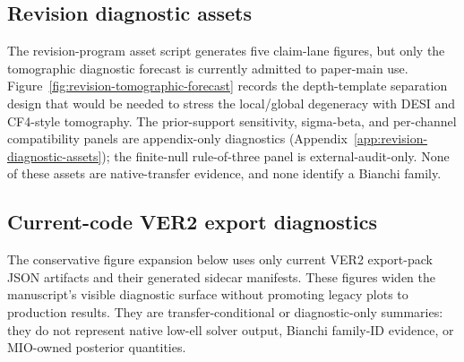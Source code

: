 \subsection{Revision diagnostic assets}
\label{sec:revision-diagnostic-assets}

The revision-program asset script generates five claim-lane figures,
but only the tomographic diagnostic forecast is currently admitted to
paper-main use.  Figure~\ref{fig:revision-tomographic-forecast}
records the depth-template separation design that would be needed to
stress the local/global degeneracy with DESI and CF4-style tomography.
The prior-support sensitivity, sigma-beta, and per-channel compatibility
panels are appendix-only diagnostics
(Appendix~\ref{app:revision-diagnostic-assets}); the finite-null
rule-of-three panel is external-audit-only.  None of these assets are
native-transfer evidence, and none identify a Bianchi family.






\subsection{Current-code VER2 export diagnostics}
\label{sec:current-code-ver2-export-diagnostics}

The conservative figure expansion below uses only current VER2 export-pack
JSON artifacts and their generated sidecar manifests.  These figures widen the
manuscript's visible diagnostic surface without promoting legacy plots to
production results.  They are transfer-conditional or diagnostic-only
summaries: they do not represent native low-ell solver output, Bianchi
family-ID evidence, or MIO-owned posterior quantities.


